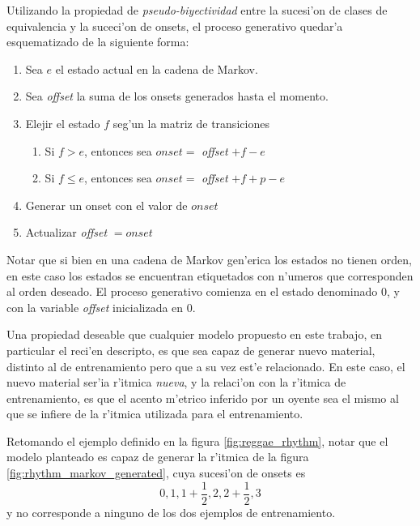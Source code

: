 Utilizando la propiedad de \emph{pseudo-biyectividad} entre la sucesi'on de clases de equivalencia y la suceci'on de onsets, 
el proceso generativo quedar'a esquematizado de la siguiente forma:

\begin{enumerate}
  \item Sea $e$ el estado actual en la cadena de Markov. 
  \item Sea \emph{offset} la suma de los onsets generados hasta el momento. 
  \item Elejir el estado $f$ seg'un la matriz de transiciones
  \begin{enumerate}
    \item Si $f > e$, entonces sea $onset=$ \emph{offset} $+ f-e$
    \item Si $f \leq e$, entonces sea $onset=$ \emph{offset} $+ f + p - e$
  \end{enumerate}
  \item Generar un onset con el valor de $onset$
  \item Actualizar \emph{offset} $= onset$
\end{enumerate}

Notar que si bien en una cadena de Markov gen'erica los estados no tienen orden, en este caso los estados se encuentran etiquetados con n'umeros que 
corresponden al orden deseado.
El proceso generativo comienza en el estado denominado $0$, y con la variable \emph{offset} inicializada en $0$.\newline

Una propiedad deseable que cualquier modelo propuesto en este trabajo, en particular el reci'en descripto, es que sea capaz de generar nuevo material, distinto al de entrenamiento
pero que a su vez est'e relacionado. En este caso, el nuevo material ser'ia r'itmica \emph{nueva}, y la relaci'on con la r'itmica de entrenamiento, es que el acento m'etrico inferido por un oyente 
sea el mismo al que se infiere de la r'itmica utilizada para el entrenamiento. 

Retomando el ejemplo definido en la figura \ref{fig:reggae_rhythm}, notar que el modelo planteado es capaz de generar la r'itmica de la figura 
\ref{fig:rhythm_markov_generated}, cuya sucesi'on de onsets es 
$$0, 1, 1+\frac{1}{2}, 2, 2+\frac{1}{2}, 3$$
y no corresponde a ninguno de los dos ejemplos de entrenamiento.

\begin{imagen}
\end{imagen}

